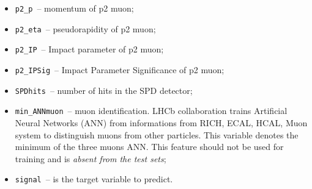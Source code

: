 \documentclass[conference]{IEEEtran}
\begin{document}
\begin{itemize}
	\item \texttt{p2\_p}~-- momentum of p2 muon;
	\item \texttt{p2\_eta}~-- pseudorapidity of p2 muon;
	\item \texttt{p2\_IP}~-- Impact parameter of p2 muon;
	\item \texttt{p2\_IPSig}~-- Impact Parameter Significance of p2 muon;
	\item \texttt{SPDhits}~-- number of hits in the SPD detector;
	\item \texttt{min\_ANNmuon}~-- muon identification. LHCb collaboration trains
  	Artificial Neural Networks (ANN) from informations from RICH, ECAL,
  	HCAL, Muon system to distinguish muons from other particles. This
  	variable denotes the minimum of the three muons ANN. This feature
  	should not be used for training and is \textit{absent from the test
		sets};
	\item \texttt{signal}~-- is the target variable to predict.
\end{itemize}

\printbibliography
\end{document}
